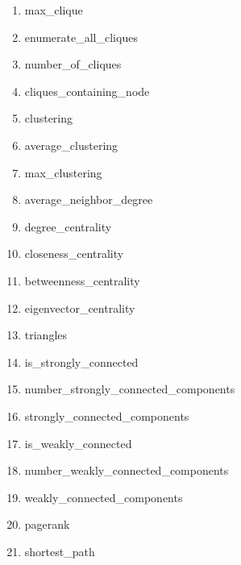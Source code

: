 \begin{enumerate}
    \item max\_clique
    \item enumerate\_all\_cliques
    \item number\_of\_cliques
    \item cliques\_containing\_node

    \item clustering
    \item average\_clustering
    \item max\_clustering

    \item average\_neighbor\_degree

    \item degree\_centrality
    \item closeness\_centrality
    \item betweenness\_centrality
    \item eigenvector\_centrality

    \item triangles

    \item is\_strongly\_connected
    \item number\_strongly\_connected\_components
    \item strongly\_connected\_components

    \item is\_weakly\_connected
    \item number\_weakly\_connected\_components
    \item weakly\_connected\_components

    \item pagerank

    \item shortest\_path
\end{enumerate}
